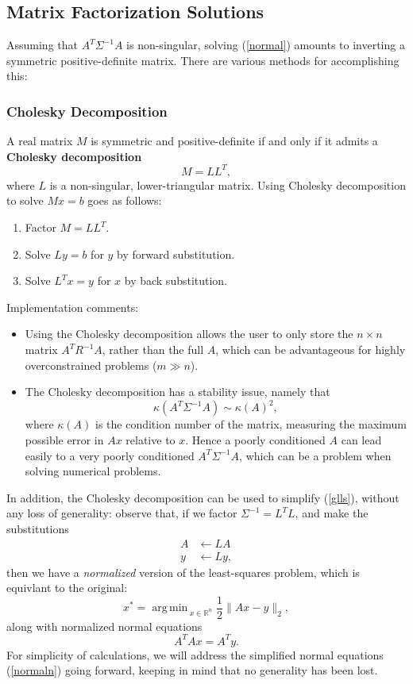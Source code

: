 \documentclass[reqno]{amsart}
\DeclareMathOperator*{\argmin}{arg\,min\,}
\numberwithin{equation}{section}
\begin{document}
\subsection{Matrix Factorization Solutions}
Assuming that $A^T \Sigma^{-1} A$ is non-singular, solving (\ref{normal}) amounts to inverting a
symmetric positive-definite matrix. There are various methods for accomplishing this:
\subsubsection{Cholesky Decomposition}
A real matrix $M$ is symmetric and positive-definite if and only if it admits
a \textbf{Cholesky decomposition}
$$
M = LL^T,
$$
where $L$ is a non-singular, lower-triangular matrix. Using Cholesky decomposition to solve
$Mx = b$ goes as follows:
\begin{enumerate}
    \item Factor $M = LL^T$.
    \item Solve $Ly = b$ for $y$ by forward substitution.
    \item Solve $L^Tx = y$ for $x$ by back substitution.
\end{enumerate}

Implementation comments:
\begin{itemize}
\item Using the Cholesky decomposition allows the user to only store the $n\times n$ matrix
    $A^T R^{-1} A$, rather than the full $A$, which can be advantageous for highly overconstrained
    problems ($m \gg n$).
\item The Cholesky decomposition has a stability issue, namely that
    $$
    \kappa(A^T \Sigma^{-1} A) \sim \kappa(A)^2,
    $$
    where $\kappa(A)$ is the condition
    number of the matrix, measuring the maximum possible error in $Ax$ relative to $x$. Hence
    a poorly conditioned $A$ can lead easily to a very poorly conditioned $A^T \Sigma^{-1} A$, which
    can be a problem when solving numerical problems.
\end{itemize}

In addition, the Cholesky decomposition can be used to simplify (\ref{glls}), without any
loss of generality: observe that, if we factor $\Sigma^{-1} = L^TL$, and make the
substitutions
\begin{align*}
    A &\leftarrow LA \\
    y &\leftarrow Ly,
\end{align*}
then we have a \emph{normalized} version of the least-squares problem, which is equivlant
to the original:
\begin{equation}
    x^* = \argmin_{x \in \mathbb R^n} \frac12 \| Ax - y\|_2,
\label{gllsn}
\end{equation}
along with normalized normal equations
\begin{equation}
    A^TAx = A^Ty.
\label{normaln}
\end{equation}
For simplicity of calculations, we will address the simplified normal equations
(\ref{normaln}) going forward, keeping in mind that no generality has been lost.
\end{document}
